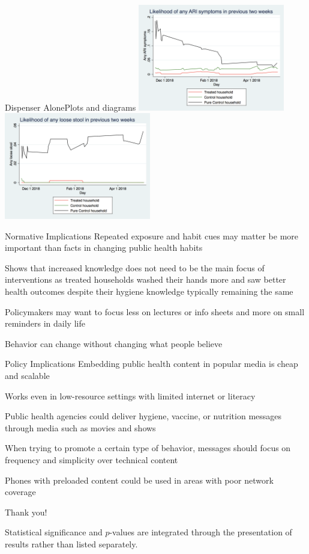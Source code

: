 \documentclass[aspectratio=169]{beamer}
\begin{document}
\begin{frame}{Dispenser Alone}{Plots and diagrams}
	\includegraphics[width=0.48\textwidth]{img-008.png}
	\includegraphics[width=0.48\textwidth]{img-010.png}
\end{frame}

\begin{frame}{Normative Implications}
	Repeated exposure and habit cues may matter be more important than
	facts in changing public health habits

	Shows that increased knowledge does not need to be the main focus of
	interventions as treated households washed their hands more and saw
	better health outcomes despite their hygiene knowledge typically
	remaining the same 

	Policymakers may want to focus less on lectures or info sheets and more
	on small reminders in daily life

	Behavior can change without changing what people believe
\end{frame}

\begin{frame}{Policy Implications}
	Embedding public health content in popular media is cheap and scalable

	Works even in low-resource settings with limited internet or literacy

	Public health agencies could deliver hygiene, vaccine, or nutrition
	messages through media such as movies and shows

	When trying to promote a certain type of behavior, messages should
	focus on frequency and simplicity over technical content 

	Phones with preloaded content could be used in areas with poor network
	coverage
\end{frame}

\begin{frame}
	\Huge
	\centering

	\vfill

	Thank you!

	\vfill

	\normalsize
	\flushleft


	\color{gray}Statistical significance and $p$-values are integrated through the
	presentation of results rather than listed separately.
\end{frame}
\end{document}
